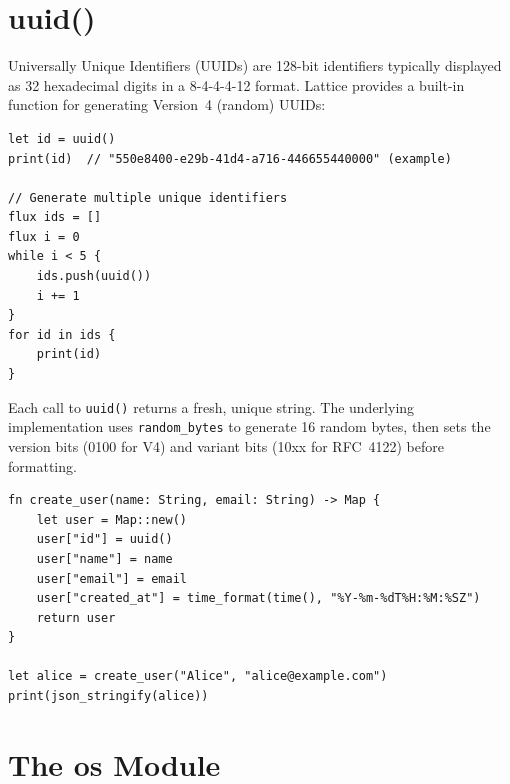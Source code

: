 \section{uuid()}\label{sec:uuid}


Universally Unique Identifiers (UUIDs) are 128-bit identifiers typically
displayed as 32 hexadecimal digits in a 8-4-4-4-12 format. Lattice provides
a built-in function for generating Version~4 (random) UUIDs:

\begin{lstlisting}[language=Lattice, caption={Generating UUIDs}]
let id = uuid()
print(id)  // "550e8400-e29b-41d4-a716-446655440000" (example)

// Generate multiple unique identifiers
flux ids = []
flux i = 0
while i < 5 {
    ids.push(uuid())
    i += 1
}
for id in ids {
    print(id)
}
\end{lstlisting}

Each call to \lstinline|uuid()| returns a fresh, unique string. The
underlying implementation uses \lstinline|random_bytes| to generate 16
random bytes, then sets the version bits (0100 for V4) and variant bits
(10xx for RFC~4122) before formatting.

\begin{lstlisting}[language=Lattice, caption={UUIDs for record identifiers}]
fn create_user(name: String, email: String) -> Map {
    let user = Map::new()
    user["id"] = uuid()
    user["name"] = name
    user["email"] = email
    user["created_at"] = time_format(time(), "%Y-%m-%dT%H:%M:%SZ")
    return user
}

let alice = create_user("Alice", "alice@example.com")
print(json_stringify(alice))
\end{lstlisting}

\section{The os Module}\label{sec:os-module}


